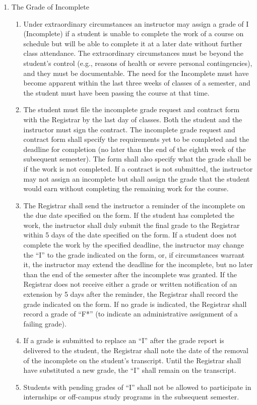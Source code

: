 \documentclass{manual}
\newcommand{\itemLevelA}{\alph*.}
\newcommand{\itemLevelB}{\arabic*)}
\newcommand{\itemRefA}{\alph*}
\newcommand{\itemRefB}{\arabic*}
\begin{document}
\begin{enumerate}[label=\itemLevelA,ref=\itemRefA]
\begin{enumerate}[label=\itemLevelB,ref=\itemRefB]
		\end{enumerate}
	
	\item The Grade of Incomplete

		\begin{enumerate}[label=\itemLevelB,ref=\itemRefB]
		\item Under extraordinary circumstances an instructor may assign a grade of I (Incomplete) if a student is unable to complete the work of a course on schedule but will be able to complete it at a later date without further class attendance. The extraordinary circumstances must be beyond the student's control (e.g., reasons of health or severe personal contingencies), and they must be documentable. The need for the Incomplete must have become apparent within the last three weeks of classes of a semester, and the student must have been passing the course at that time.
		\item The student must file the incomplete grade request and contract form with the Registrar by the last day of classes. Both the student and the instructor must sign the contract. The incomplete grade request and contract form shall specify the requirements yet to be completed and the deadline for completion (no later than the end of the eighth week of the subsequent semester). The form shall also specify what the grade shall be if the work is not completed. If a contract is not submitted, the instructor may not assign an incomplete but shall assign the grade that the student would earn without completing the remaining work for the course.
		\item The Registrar shall send the instructor a reminder of the incomplete on the due date specified on the form. If the student has completed the work, the instructor shall duly submit the final grade to the Registrar within 5 days of the date specified on the form. If a student does not complete the work by the specified deadline, the instructor may change the ``I'' to the grade indicated on the form, or, if circumstances warrant it, the instructor may extend the deadline for the incomplete, but no later than the end of the semester after the incomplete was granted. If the Registrar does not receive either a grade or written notification of an extension by 5 days after the reminder, the Registrar shall record the grade indicated on the form. If no grade is indicated, the Registrar shall record a grade of ``F*'' (to indicate an administrative assignment of a failing grade).
		\item If a grade is submitted to replace an ``I'' after the grade report is delivered to the student, the Registrar shall note the date of the removal of the incomplete on the student's transcript. Until the Registrar shall have substituted a new grade, the ``I'' shall remain on the transcript.
		\item Students with pending grades of ``I'' shall not be allowed to participate in internships or off-campus study programs in the subsequent semester.
		\end{enumerate}
	

\end{enumerate}
\end{document}
